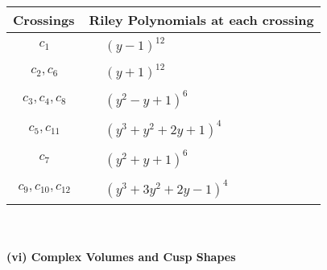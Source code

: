 \documentclass[1p]{elsarticle_modified}
\theoremstyle{definition}
\begin{document}
\begin{tabular}{m{50pt}|m{274pt}}
Crossings & \hspace{64pt}Riley Polynomials at each crossing \\
\hline $$\begin{aligned}c_{1}\end{aligned}$$&$\begin{aligned}
&(y-1)^{12}
\end{aligned}$\\
\hline $$\begin{aligned}c_{2},c_{6}\end{aligned}$$&$\begin{aligned}
&(y+1)^{12}
\end{aligned}$\\
\hline $$\begin{aligned}c_{3},c_{4},c_{8}\end{aligned}$$&$\begin{aligned}
&(y^2- y+1)^6
\end{aligned}$\\
\hline $$\begin{aligned}c_{5},c_{11}\end{aligned}$$&$\begin{aligned}
&(y^3+y^2+2 y+1)^4
\end{aligned}$\\
\hline $$\begin{aligned}c_{7}\end{aligned}$$&$\begin{aligned}
&(y^2+y+1)^6
\end{aligned}$\\
\hline $$\begin{aligned}c_{9},c_{10},c_{12}\end{aligned}$$&$\begin{aligned}
&(y^3+3 y^2+2 y-1)^4
\end{aligned}$\\
\hline
\end{tabular}\\~\\
\newpage\flushleft \textbf{(vi) Complex Volumes and Cusp Shapes}
\end{document}
